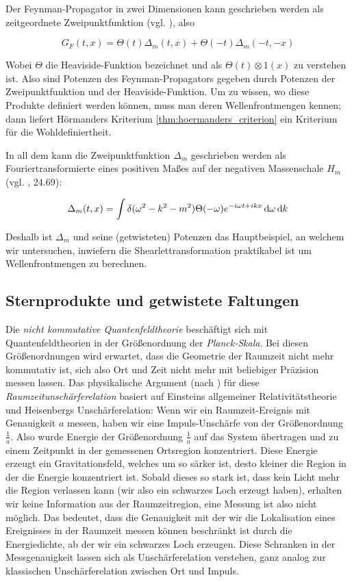 Der Feynman-Propagator in zwei Dimensionen kann geschrieben werden als zeitgeordnete Zweipunktfunktion (vgl. \textcite{ReedSimon}), also

\begin{equation}
    G_F(t,x)
    =
    \Theta (t)\Delta_m(t,x) + \Theta(-t)\Delta_m(-t,-x)
    \label{eq:feynman_propgator_as_product}
\end{equation}

Wobei $\Theta$ die Heaviside-Funktion bezeichnet und als $\Theta(t) \otimes 1(x)$ zu verstehen ist. Also sind Potenzen des Feynman-Propagators gegeben durch Potenzen der Zweipunktfunktion und der Heaviside-Funktion. Um zu wissen, wo diese Produkte definiert werden können, muss man deren Wellenfrontmengen kennen; dann liefert Hörmanders Kriterium \ref{thm:hoermanders_criterion} ein Kriterium für die Wohldefiniertheit.

In all dem kann die Zweipunktfunktion $\Delta_m$ geschrieben werden als Fouriertransformierte eines positiven Maßes auf der negativen Massenschale $H_m$ (vgl. \textcite{Schwartz2014}, 24.69):

\begin{equation}
    \Delta_m (t,x) = \int \delta (\omega^2-k^2-m^2)
                    \Theta(-\omega)e^{-i\omega t + i k x} \mathop{}\!\mathrm{d} \omega \mathop{}\!\mathrm{d} k
\label{eq:delta_m}
\end{equation}

Deshalb ist $\Delta_m$ und seine (getwisteten) Potenzen das Hauptbeispiel, an welchem wir untersuchen, inwiefern die Shearlettransformation praktikabel ist um Wellenfrontmengen zu berechnen.

\subsection{Sternprodukte und getwistete Faltungen}
Die \emph{nicht kommutative Quantenfeldtheorie} beschäftigt sich mit Quantenfeldtheorien in der Größenordnung der \emph{Planck-Skala}. Bei diesen Größenordnungen wird erwartet, dass die Geometrie der Raumzeit nicht mehr kommutativ ist, sich also Ort und Zeit nicht mehr mit beliebiger Präzision messen lassen. Das physikalische Argument (nach \textcite{Doplicher1995}) für diese \emph{Raumzeitunschärferelation} basiert auf Einsteins allgemeiner Relativitätstheorie und Heisenbergs Unschärferelation: Wenn wir ein Raumzeit-Ereignis mit Genauigkeit $a$ messen, haben wir eine Impuls-Unschärfe von der Größenordnung $\frac{1}{a}$. Also wurde Energie der Größenordnung $\frac{1}{a}$ auf das System übertragen und zu einem Zeitpunkt in der gemessenen Ortsregion konzentriert. Diese Energie erzeugt ein Gravitationsfeld, welches um so särker ist, desto kleiner die Region in der die Energie konzentriert ist. Sobald dieses so stark ist, dass kein Licht mehr die Region verlassen kann (wir also ein schwarzes Loch erzeugt haben), erhalten wir keine Information aus der Raumzeitregion, eine Messung ist also nicht möglich. Das bedeutet, dass die Genauigkeit mit der wir die Lokalisation eines Ereignisses in der Raumzeit messen können beschränkt ist durch die Energiedichte, ab der wir ein schwarzes Loch erzeugen. Diese Schranken in der Messgenauigkeit lassen sich als Unschärferelation verstehen, ganz analog zur klassischen Unschärferelation zwischen Ort und Impuls.

